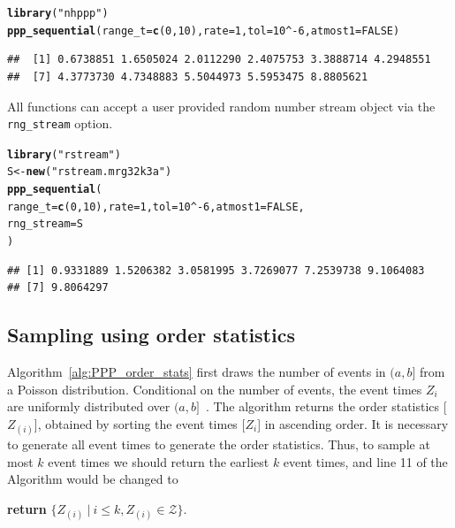 \documentclass[article]{jss}\usepackage[]{graphicx}\usepackage[]{xcolor}
\makeatletter
\newcommand{\hlnum}[1]{\textcolor[rgb]{0.686,0.059,0.569}{#1}}%
\newcommand{\hlstr}[1]{\textcolor[rgb]{0.192,0.494,0.8}{#1}}%
\newcommand{\hlopt}[1]{\textcolor[rgb]{0,0,0}{#1}}%
\newcommand{\hlstd}[1]{\textcolor[rgb]{0.345,0.345,0.345}{#1}}%
\newcommand{\hlkwb}[1]{\textcolor[rgb]{0.69,0.353,0.396}{#1}}%
\newcommand{\hlkwc}[1]{\textcolor[rgb]{0.333,0.667,0.333}{#1}}%
\newcommand{\hlkwd}[1]{\textcolor[rgb]{0.737,0.353,0.396}{\textbf{#1}}}%
\newenvironment{kframe}{%
 \def\at@end@of@kframe{}%
 \ifinner\ifhmode%
  \def\at@end@of@kframe{\end{minipage}}%
  \begin{minipage}{\columnwidth}%
 \fi\fi%
 \def\FrameCommand##1{\hskip\@totalleftmargin \hskip-\fboxsep
 \colorbox{shadecolor}{##1}\hskip-\fboxsep
     \hskip-\linewidth \hskip-\@totalleftmargin \hskip\columnwidth}%
 \MakeFramed {\advance\hsize-\width
   \@totalleftmargin\z@ \linewidth\hsize
   \@setminipage}}%
 {\par\unskip\endMakeFramed%
 \at@end@of@kframe}
\newenvironment{knitrout}{}{} %
\makeatother
\begin{document}
\begin{knitrout}
\color{fgcolor}\begin{kframe}
\begin{alltt}
\hlkwd{library}\hlstd{(}\hlstr{"nhppp"}\hlstd{)}
\hlkwd{ppp_sequential}\hlstd{(}\hlkwc{range_t} \hlstd{=} \hlkwd{c}\hlstd{(}\hlnum{0}\hlstd{,} \hlnum{10}\hlstd{),} \hlkwc{rate} \hlstd{=} \hlnum{1}\hlstd{,} \hlkwc{tol} \hlstd{=} \hlnum{10}\hlopt{^-}\hlnum{6}\hlstd{,} \hlkwc{atmost1} \hlstd{=} \hlnum{FALSE}\hlstd{)}
\end{alltt}
\begin{verbatim}
##  [1] 0.6738851 1.6505024 2.0112290 2.4075753 3.3888714 4.2948551
##  [7] 4.3773730 4.7348883 5.5044973 5.5953475 8.8805621
\end{verbatim}
\end{kframe}
\end{knitrout}

All  functions can accept a user provided random number stream object via the \texttt{rng\_stream} option.

\begin{knitrout}
\color{fgcolor}\begin{kframe}
\begin{alltt}
\hlkwd{library}\hlstd{(}\hlstr{"rstream"}\hlstd{)}
\hlstd{S} \hlkwb{<-} \hlkwd{new}\hlstd{(}\hlstr{"rstream.mrg32k3a"}\hlstd{)}
\hlkwd{ppp_sequential}\hlstd{(}
  \hlkwc{range_t} \hlstd{=} \hlkwd{c}\hlstd{(}\hlnum{0}\hlstd{,} \hlnum{10}\hlstd{),} \hlkwc{rate} \hlstd{=} \hlnum{1}\hlstd{,} \hlkwc{tol} \hlstd{=} \hlnum{10}\hlopt{^-}\hlnum{6}\hlstd{,} \hlkwc{atmost1} \hlstd{=} \hlnum{FALSE}\hlstd{,}
  \hlkwc{rng_stream} \hlstd{= S}
\hlstd{)}
\end{alltt}
\begin{verbatim}
## [1] 0.9331889 1.5206382 3.0581995 3.7269077 7.2539738 9.1064083
## [7] 9.8064297
\end{verbatim}
\end{kframe}
\end{knitrout}


\subsection{Sampling using order statistics}\label{sec:PPP_order_stats}


Algorithm~\ref{alg:PPP_order_stats} first draws the number of events in $(a, b]$ from a Poisson distribution. Conditional on the number of events, the event times $Z_i$ are uniformly distributed over $(a, b]$~\citep[par. 4.1]{cox1965theory}. The algorithm returns the order statistics [$Z_{(i)}$], obtained by sorting the event times [$Z_i$] in ascending order. It is necessary to generate all event times to generate the order statistics. Thus, to sample at most $k$ event times we should return the earliest $k$ event times, and line 11 of the Algorithm would be changed to
\begin{center}
\textbf{return} {$\{Z_{(i)} \ | \ i \le k, Z_{(i)} \in \mathcal{Z}\}$}.
\end{center}
\end{document}

